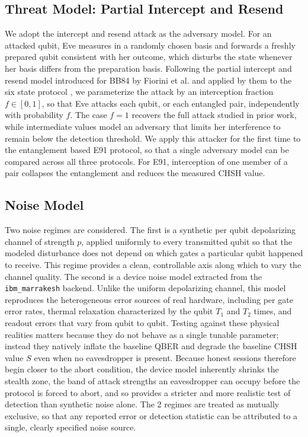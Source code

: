 \documentclass[conference]{IEEEtran}
\begin{document}
\subsection{Threat Model: Partial Intercept and Resend}
\label{subsec:threat}
We adopt the intercept and resend attack as the adversary model. For an attacked
qubit, Eve measures in a randomly chosen basis and forwards a freshly prepared
qubit consistent with her outcome, which disturbs the state whenever her basis
differs from the preparation basis. Following the partial intercept and resend
model introduced for BB84 by Fiorini et al. \cite{fiorini2024estimating} and
applied by them to the six state protocol \cite{fiorini2025sixstate}, we
parameterize the attack by an interception fraction $f \in [0, 1]$, so that Eve
attacks each qubit, or each entangled pair, independently with probability $f$.
The case $f = 1$ recovers the full attack studied in prior work, while
intermediate values model an adversary that limits her interference to remain
below the detection threshold. We apply this attacker for the first time to the
entanglement based E91 protocol, so that a single adversary model can be compared
across all three protocols. For E91, interception of one member of a pair
collapses the entanglement and reduces the measured CHSH value.



\subsection{Noise Model}
\label{subsec:noise}
Two noise regimes are considered. The first is a synthetic per qubit depolarizing
channel of strength $p$, applied uniformly to every transmitted qubit so that the
modeled disturbance does not depend on which gates a particular qubit happened to
receive. This regime provides a clean, controllable axis along which to vary the
channel quality. The second is a device noise model extracted from the
\texttt{ibm\_marrakesh} backend. Unlike the uniform depolarizing channel, this
model reproduces the heterogeneous error sources of real hardware, including per
gate error rates, thermal relaxation characterized by the qubit $T_1$ and $T_2$
times, and readout errors that vary from qubit to qubit. Testing against these
physical realities matters because they do not behave as a single tunable
parameter; instead they natively inflate the baseline QBER and degrade the
baseline CHSH value $S$ even when no eavesdropper is present. Because honest
sessions therefore begin closer to the abort condition, the device model
inherently shrinks the stealth zone, the band of attack strengths an eavesdropper
can occupy before the protocol is forced to abort, and so provides a stricter and
more realistic test of detection than synthetic noise alone. The 2 regimes are
treated as mutually exclusive, so that any reported error or detection statistic
can be attributed to a single, clearly specified noise source.
\end{document}
